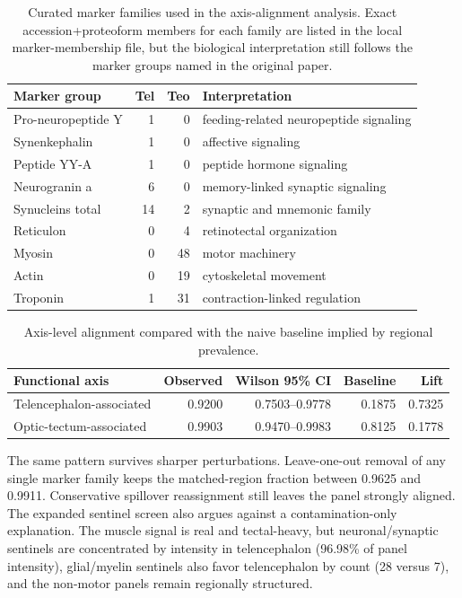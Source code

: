 \begin{table}[t]
\centering
\caption{Curated marker families used in the axis-alignment analysis. Exact accession+proteoform members for each family are listed in the local marker-membership file, but the biological interpretation still follows the marker groups named in the original paper.}
\label{tab:markers}
\begin{tabular}{lrrl}
\toprule
Marker group & Tel & Teo & Interpretation \\
\midrule
Pro-neuropeptide Y & 1 & 0 & feeding-related neuropeptide signaling \\
Synenkephalin & 1 & 0 & affective signaling \\
Peptide YY-A & 1 & 0 & peptide hormone signaling \\
Neurogranin a & 6 & 0 & memory-linked synaptic signaling \\
Synucleins total & 14 & 2 & synaptic and mnemonic family \\
Reticulon & 0 & 4 & retinotectal organization \\
Myosin & 0 & 48 & motor machinery \\
Actin & 0 & 19 & cytoskeletal movement \\
Troponin & 1 & 31 & contraction-linked regulation \\
\bottomrule
\end{tabular}
\end{table}

\begin{table}[t]
\centering
\caption{Axis-level alignment compared with the naive baseline implied by regional prevalence.}
\label{tab:axisstats}
\begin{tabular}{lrrrr}
\toprule
Functional axis & Observed & Wilson 95\% CI & Baseline & Lift \\
\midrule
Telencephalon-associated & 0.9200 & 0.7503--0.9778 & 0.1875 & 0.7325 \\
Optic-tectum-associated & 0.9903 & 0.9470--0.9983 & 0.8125 & 0.1778 \\
\bottomrule
\end{tabular}
\end{table}

The same pattern survives sharper perturbations. Leave-one-out removal of any single marker family keeps the matched-region fraction between 0.9625 and 0.9911. Conservative spillover reassignment still leaves the panel strongly aligned. The expanded sentinel screen also argues against a contamination-only explanation. The muscle signal is real and tectal-heavy, but neuronal/synaptic sentinels are concentrated by intensity in telencephalon (96.98\% of panel intensity), glial/myelin sentinels also favor telencephalon by count (28 versus 7), and the non-motor panels remain regionally structured.

